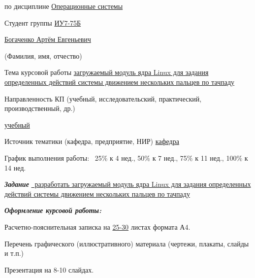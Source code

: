 \begin{flushleft}
	\fontsize{12pt}{0.6cm}\selectfont
	
	по дисциплине \uline{\hfill Операционные системы\hfill}
	
	Студент группы \uline{ИУ7-75Б}
	
	\centerline{\uline{\hfill Богаченко Артём Евгеньевич \hfill}}
	\scriptsize\mbox{\hspace{7cm}}(Фамилия, имя, отчество)
	
	\fontsize{12pt}{0.6cm}\selectfont
	
	\fontsize{12pt}{0.5\baselineskip}\selectfont
	Тема курсовой работы {\uline{\hfill загружаемый модуль ядра Linux для задания определенных действий системы движением нескольких пальцев по тачпаду \hfill}}
	
	
	Направленность КП (учебный, исследовательский, практический, производственный, др.)\hfill\centerline{\uline{\hfill учебный \hfill}}
	
	Источник тематики (кафедра, предприятие, НИР) {\uline{\hfill кафедра \hfill}}
	
	\fontsize{12pt}{0.6\baselineskip}\selectfont
	График выполнения работы: ~25\% к 4 нед., 50\% к 7 нед., 75\% к 11 нед., 100\% к 14 нед.
	
	\addvspace{8pt}
	\fontsize{12pt}{0.5\baselineskip}\selectfont
	\textit{\bfseries{Задание}} 
	\uline{~разработать загружаемый модуль ядра Linux для задания определенных действий системы движением нескольких пальцев по тачпаду\hfill}
	
	\addvspace{6pt}
	
	\textit{\bfseries{Оформление курсовой работы:}}
	
	\fontsize{12pt}{0.1cm}\selectfont
	Расчетно-пояснительная записка на \uline{25-30} листах формата А4.
	
	Перечень графического (иллюстративного) материала (чертежи, плакаты, слайды и т.п.)
	
	Презентация на 8-10 слайдах.
\end{flushleft}

\vspace*{-0.3cm}

